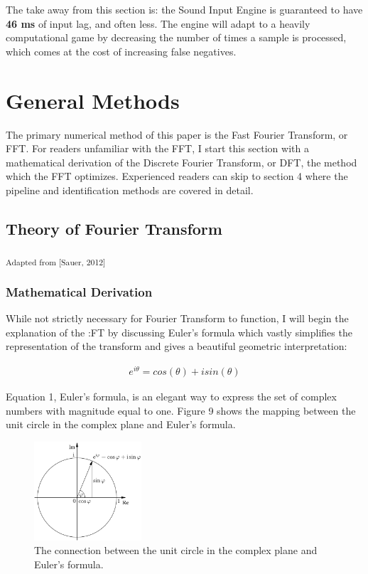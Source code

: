 \documentclass[DIV=calc, paper=a4, fontsize=11pt, twocolumn]{scrartcl}   %
\begin{document}
\par The take away from this section is: the Sound Input Engine is guaranteed to  have \textbf{46 ms} of input lag, and often less. The engine will adapt to a heavily computational game by decreasing the number of times a sample is processed, which comes at the cost of increasing false negatives.


\section{General Methods}
The primary numerical method of this paper is the Fast Fourier Transform, or FFT. For readers unfamiliar with the FFT, I start this section with a mathematical derivation of the Discrete Fourier Transform, or DFT, the method which the FFT optimizes. Experienced readers can skip to section 4 where the pipeline and identification methods are covered in detail.
\subsection{Theory of Fourier Transform}
\textsubscript{Adapted from [Sauer, 2012]}
\subsubsection{Mathematical Derivation}

While not strictly necessary for Fourier Transform to function, I will begin the explanation of the :FT by discussing Euler's formula which vastly simplifies the representation of the transform and gives a beautiful geometric interpretation:

\begin{align}
e^{i\theta} = cos(\theta) + isin(\theta)
\end{align}

Equation 1, Euler's formula, is an elegant way to express the set of complex numbers with magnitude equal to one. Figure 9 shows the mapping between the unit circle in the complex plane and Euler's formula.

\begin{figure}[h]
\centering
\includegraphics[width=40mm]{figures/EulersFormula.png}
\caption{The connection between the unit circle in the complex plane and Euler's formula. }
\label{overflow}
\end{figure}
\end{document}
